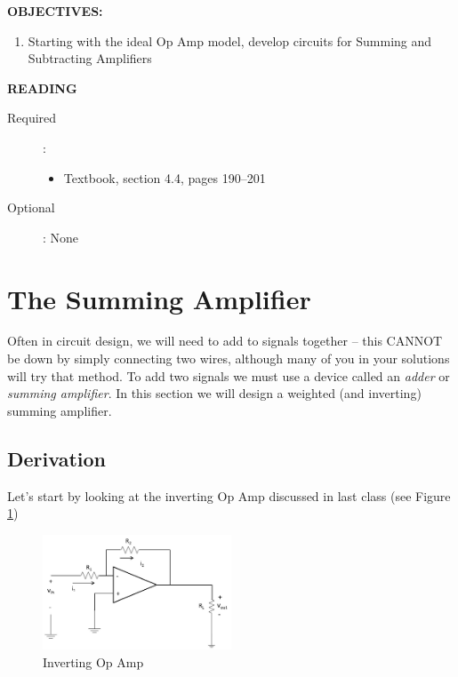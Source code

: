 \documentclass{handout}
\begin{document}
\maketitle

\textbf{OBJECTIVES:}
\begin{enumerate}
\item Starting with the ideal Op Amp model, develop circuits for Summing and Subtracting Amplifiers
\end{enumerate}

\textbf{READING}
\begin{description}
\item [Required]:
\begin{itemize}
\item  Textbook, section 4.4, pages 190--201
\end{itemize}
\item [Optional]: None
\end{description}

\section{The Summing Amplifier}
Often in circuit design, we will need to add to signals together -- this CANNOT be down by simply connecting two wires, although many of you in your solutions will try that method.  To add two signals we must use a device called an {\em adder} or {\em summing amplifier}.   In this section we will design a weighted (and inverting) summing amplifier.

\subsection{Derivation}
Let's start by looking at the inverting Op Amp discussed in last class (see Figure \ref{fig: InvertingOpAmp})

\begin{figure} [h! t! b!]
\centering
\includegraphics[width=0.5\textwidth]{InvertingOpAmp.jpg}
\caption{Inverting Op Amp}
\label{fig: InvertingOpAmp}
\end{figure}
\end{document}
